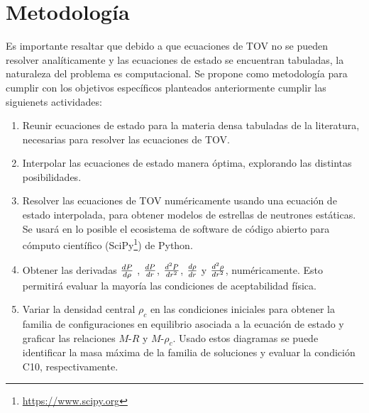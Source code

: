 \chapter{Metodología}
\setcounter{footnote}{0}
Es importante resaltar que debido a que ecuaciones de TOV no se pueden resolver analíticamente y las ecuaciones de estado se encuentran tabuladas, la naturaleza del problema es computacional. 
Se propone como metodología para cumplir con los objetivos específicos planteados anteriormente cumplir las siguienets actividades:

\begin{enumerate}
    \item Reunir ecuaciones de estado para la materia densa tabuladas de la literatura, necesarias para resolver las ecuaciones de TOV.
    \item Interpolar las ecuaciones de estado manera óptima, explorando las distintas posibilidades.
    \item Resolver las ecuaciones de TOV numéricamente usando una ecuación de estado interpolada, para obtener modelos de estrellas de neutrones estáticas. Se usará en lo posible el ecosistema de software de código abierto para cómputo científico (SciPy\footnote{\url{https://www.scipy.org}}) de Python.
    \item Obtener las derivadas $\dv{P}{\rho}$ ,  $\dv{P}{r}$, $\dv[2]{P}{r}$, $\dv{\rho}{r}$ y $\dv[2]{\rho}{r}$, numéricamente. Esto permitirá evaluar la mayoría las condiciones de aceptabilidad física. 
    \item Variar la densidad central $\rho_c$ en las condiciones iniciales para obtener la familia de configuraciones en equilibrio asociada a la ecuación de estado y graficar las relaciones $M$-$R$ y $M$-$\rho_c$. Usado estos diagramas se puede identificar la masa máxima de la familia de soluciones y evaluar la condición C10, respectivamente.
\end{enumerate}
